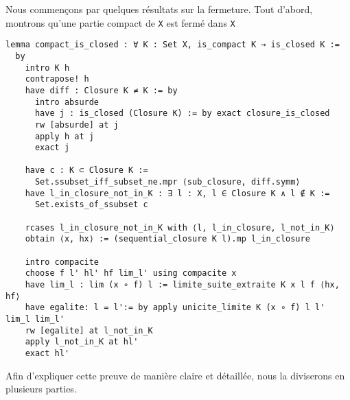 \documentclass[a4paper, 12pt]{article}
\newcommand{\lean}[1]{\texttt{#1}}
\begin{document}
Nous commençons par quelques résultats sur la fermeture. Tout d'abord, montrons qu'une partie compact de \lean{X} est fermé dans \lean{X}

\begin{verbatim}
lemma compact_is_closed : ∀ K : Set X, is_compact K → is_closed K :=
  by
    intro K h
    contrapose! h
    have diff : Closure K ≠ K := by
      intro absurde
      have j : is_closed (Closure K) := by exact closure_is_closed
      rw [absurde] at j
      apply h at j
      exact j

    have c : K ⊂ Closure K :=
      Set.ssubset_iff_subset_ne.mpr ⟨sub_closure, diff.symm⟩
    have l_in_closure_not_in_K : ∃ l : X, l ∈ Closure K ∧ l ∉ K :=
      Set.exists_of_ssubset c

    rcases l_in_closure_not_in_K with ⟨l, l_in_closure, l_not_in_K⟩
    obtain ⟨x, hx⟩ := (sequential_closure K l).mp l_in_closure

    intro compacite
    choose f l' hl' hf lim_l' using compacite x
    have lim_l : lim (x ∘ f) l := limite_suite_extraite K x l f ⟨hx, hf⟩
    have egalite: l = l':= by apply unicite_limite K (x ∘ f) l l' lim_l lim_l'
    rw [egalite] at l_not_in_K
    apply l_not_in_K at hl'
    exact hl'
\end{verbatim}

Afin d'expliquer cette preuve de manière claire et détaillée, nous la diviserons en plusieurs parties.
\end{document}
